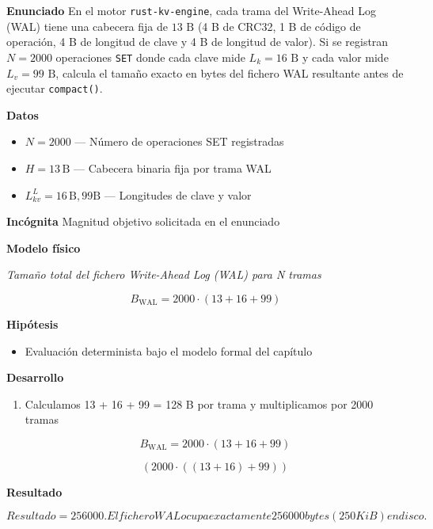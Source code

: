 \documentclass{book}
\begin{document}
\begin{tcolorbox}[title={Problema resuelto}, studiumworked, breakable]

\noindent\textbf{Enunciado}
En el motor \texttt{rust-kv-engine}, cada trama del Write-Ahead Log (WAL) tiene una cabecera fija de \(13\text{ B}\) (4 B de CRC32, 1 B de código de operación, 4 B de longitud de clave y 4 B de longitud de valor). Si se registran \(N = 2000\) operaciones \texttt{SET} donde cada clave mide \(L_k = 16\text{ B}\) y cada valor mide \(L_v = 99\text{ B}\), calcula el tamaño exacto en bytes del fichero WAL resultante antes de ejecutar \texttt{compact()}.

\noindent\textbf{Datos}
\begin{itemize}
\item $N = 2000$ — Número de operaciones SET registradas
\item $H = 13\,\mathrm{B}$ — Cabecera binaria fija por trama WAL
\item $L^{L}_{k v} = 16\,\mathrm{B, 99 B}$ — Longitudes de clave y valor
\end{itemize}

\noindent\textbf{Incógnita}
Magnitud objetivo solicitada en el enunciado

\noindent\textbf{Modelo físico}

\noindent\textit{Tamaño total del fichero Write-Ahead Log (WAL) para N tramas}

\[
B_{\text{WAL}} = 2000 \cdot (13 + 16 + 99)
\]

\noindent\textbf{Hipótesis}
\begin{itemize}
\item Evaluación determinista bajo el modelo formal del capítulo
\end{itemize}

\noindent\textbf{Desarrollo}
\begin{enumerate}
\item
Calculamos 13 + 16 + 99 = 128 B por trama y multiplicamos por 2000 tramas

\[
B_{\text{WAL}} = 2000 \cdot (13 + 16 + 99)
\]

\[
\left(2000\cdot \left(\left(13+16\right)+99\right)\right)
\]
\end{enumerate}

\noindent\textbf{Resultado}

\[
Resultado = 256000. El fichero WAL ocupa exactamente 256 000 bytes (250 KiB) en disco.
\]


\end{tcolorbox}
\end{document}
